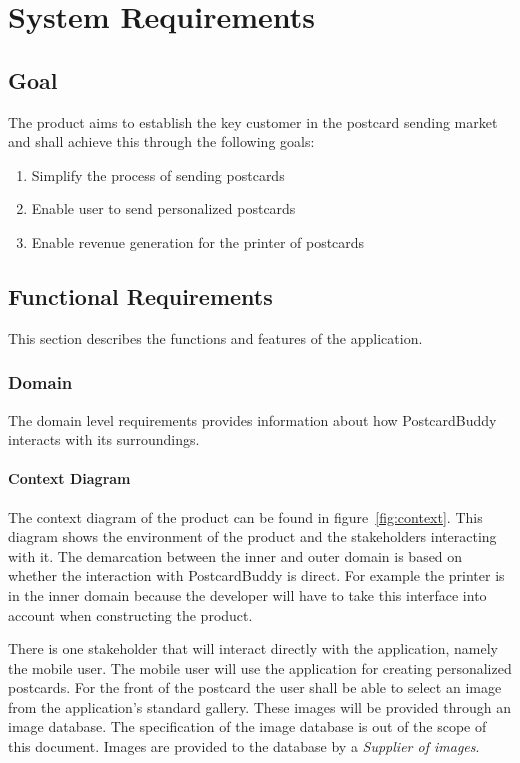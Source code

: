 \documentclass[10pt,a4paper]{article}
\begin{document}
\section{System Requirements}

\subsection{Goal}
The product aims to establish the key customer in the postcard sending market and shall achieve this through the following goals:

\begin{enumerate}
\item Simplify the process of sending postcards \label{goal:simpl}
\item Enable user to send personalized postcards \label{goal:pers}
\item Enable revenue generation for the printer of postcards \label{goal:rev}
\end{enumerate}

\subsection{Functional Requirements}
This section describes the functions and features of the application.

\subsubsection{Domain}
The domain level requirements provides information about how PostcardBuddy interacts with its surroundings. 

\paragraph{Context Diagram}
The context diagram of the product can be found in figure~\ref{fig:context}. This diagram shows the environment of the product and the stakeholders interacting with it. The demarcation between the inner and outer domain is based on whether the interaction with PostcardBuddy is direct. For example the printer is in the inner domain because the developer will have to take this interface into account when constructing the product. 

There is one stakeholder that will interact directly with the application, namely the mobile user. The mobile user will use the application for creating personalized postcards. For the front of the postcard the user shall be able to select an image from the application's standard gallery. These images will be provided through an image database. The specification of the image database is out of the scope of this document. Images are provided to the database by a \textit{Supplier of images}.
\end{document}
